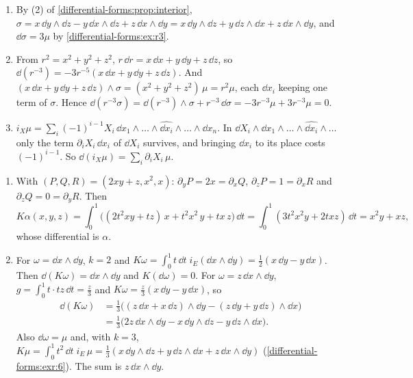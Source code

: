 \begin{enumerate}[nosep]
  \item By (2) of \cref{differential-forms:prop:interior},
        $\sigma = x\,\dd y\wedge\dd z - y\,\dd x\wedge\dd z
        + z\,\dd x\wedge\dd y
        = x\,\dd y\wedge\dd z + y\,\dd z\wedge\dd x
        + z\,\dd x\wedge\dd y$, and $\dd\sigma = 3\mu$ by
        \cref{differential-forms:ex:r3}.
  \item From $r^2 = x^2 + y^2 + z^2$,
        $r\,\dd r = x\,\dd x + y\,\dd y + z\,\dd z$, so
        $\dd(r^{-3}) = -3r^{-5}(x\,\dd x + y\,\dd y + z\,\dd z)$. And
        $(x\,\dd x + y\,\dd y + z\,\dd z)\wedge\sigma
        = (x^2 + y^2 + z^2)\,\mu = r^2\mu$, each $\dd x_i$ keeping one
        term of $\sigma$. Hence
        $\dd(r^{-3}\sigma) = \dd(r^{-3})\wedge\sigma + r^{-3}\,\dd\sigma
        = -3r^{-3}\mu + 3r^{-3}\mu = 0$.
  \item $i_X\mu = \sum_i(-1)^{i-1}X_i\,
        \dd x_1\wedge\dots\wedge\widehat{\dd x_i}\wedge\dots\wedge
        \dd x_n$. In $\dd X_i\wedge\dd x_1\wedge\dots\wedge
        \widehat{\dd x_i}\wedge\dots$ only the term
        $\partial_iX_i\,\dd x_i$ of $\dd X_i$ survives, and bringing
        $\dd x_i$ to its place costs $(-1)^{i-1}$. So
        $\dd(i_X\mu) = \sum_i\partial_iX_i\,\mu$.
\end{enumerate}

\begin{enumerate}[nosep]
  \item With $(P, Q, R) = (2xy + z, x^2, x)$:
        $\partial_yP = 2x = \partial_xQ$,
        $\partial_zP = 1 = \partial_xR$ and
        $\partial_zQ = 0 = \partial_yR$. Then
        \[
          K\alpha(x, y, z)
          = \int_0^1\bigl((2t^2xy + tz)\,x + t^2x^2\,y + tx\,z\bigr)\,
            \dd t
          = \int_0^1(3t^2x^2y + 2txz)\,\dd t = x^2y + xz ,
        \]
        whose differential is $\alpha$.
  \item For $\omega = \dd x\wedge\dd y$, $k = 2$ and
        $K\omega = \int_0^1t\,\dd t\;i_E(\dd x\wedge\dd y)
        = \frac12(x\,\dd y - y\,\dd x)$. Then
        $\dd(K\omega) = \dd x\wedge\dd y$ and $K(\dd\omega) = 0$. For
        $\omega = z\,\dd x\wedge\dd y$,
        $g = \int_0^1t\cdot tz\,\dd t = \frac z3$ and
        $K\omega = \frac z3(x\,\dd y - y\,\dd x)$, so
        \begin{align*}
          \dd(K\omega)
          &= \tfrac13\bigl((z\,\dd x + x\,\dd z)\wedge\dd y
            - (z\,\dd y + y\,\dd z)\wedge\dd x\bigr) \\
          &= \tfrac13\bigl(2z\,\dd x\wedge\dd y - x\,\dd y\wedge\dd z
            - y\,\dd z\wedge\dd x\bigr) .
        \end{align*}
        Also $\dd\omega = \mu$ and, with $k = 3$,
        $K\mu = \int_0^1t^2\,\dd t\;i_E\,\mu
        = \frac13(x\,\dd y\wedge\dd z + y\,\dd z\wedge\dd x
        + z\,\dd x\wedge\dd y)$
        (\cref{differential-forms:exr:6}). The sum is
        $z\,\dd x\wedge\dd y$.
\end{enumerate}

